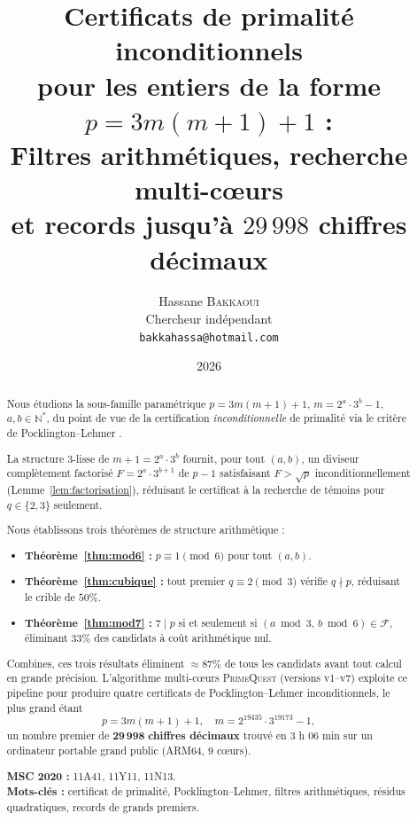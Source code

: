 \documentclass[11pt,a4paper]{article}
\title{Certificats de primalité inconditionnels\\
pour les entiers de la forme $p = 3m(m+1)+1$ :\\[4pt]
{\large Filtres arithmétiques, recherche multi-c\oe{}urs\\
et records jusqu'à $29\,998$ chiffres décimaux}}
\author{Hassane \textsc{Bakkaoui}\\
\small Chercheur indépendant\\
\small \texttt{bakkahassa@hotmail.com}}
\date{2026}
\theoremstyle{definition}
\theoremstyle{remark}
\newcommand{\N}{\mathbb{N}}
\newcommand{\F}{\mathcal{F}}
\begin{document}
\maketitle

\begin{abstract}
Nous étudions la sous-famille paramétrique $p = 3m(m+1)+1$,
$m = 2^a\cdot 3^b - 1$, $a,b \in \N^*$, du point de vue de la
certification \emph{inconditionnelle} de primalité via le critère de
Pocklington--Lehmer \cite{Pocklington1914,LehmerPSW1975}.

La structure $3$-lisse de $m+1 = 2^a\cdot 3^b$ fournit, pour tout $(a,b)$,
un diviseur complètement factorisé $F = 2^a\cdot 3^{b+1}$ de $p-1$
satisfaisant $F>\sqrt{p}$ inconditionnellement
(Lemme~\ref{lem:factorisation}), réduisant le certificat à la recherche
de témoins pour $q\in\{2,3\}$ seulement.

Nous établissons trois théorèmes de structure arithmétique :
\begin{itemize}
\item \textbf{Théorème~\ref{thm:mod6} :}
  $p\equiv 1\pmod{6}$ pour tout $(a,b)$.
\item \textbf{Théorème~\ref{thm:cubique} :}
  tout premier $q\equiv 2\pmod{3}$ vérifie $q\nmid p$,
  réduisant le crible de $50\%$.
\item \textbf{Théorème~\ref{thm:mod7} :}
  $7\mid p$ si et seulement si $(a\bmod 3,\,b\bmod 6)\in\F$,
  éliminant $33\%$ des candidats à coût arithmétique nul.
\end{itemize}

Combines, ces trois résultats éliminent $\approx 87\%$ de tous les
candidats avant tout calcul en grande précision. L'algorithme
multi-c\oe{}urs \textsc{PrimeQuest} (versions v1--v7) exploite ce pipeline
pour produire quatre certificats de Pocklington--Lehmer inconditionnels,
le plus grand étant
\[
  p = 3m(m+1)+1,\quad m = 2^{19435}\cdot 3^{19173}-1,
\]
un nombre premier de $\mathbf{29\,998}$ \textbf{chiffres décimaux} trouvé
en $3$ h $06$ min sur un ordinateur portable grand public
(ARM64, 9 c\oe{}urs).

\smallskip
\noindent\textbf{MSC 2020 :} 11A41, 11Y11, 11N13.\\
\textbf{Mots-clés :} certificat de primalité, Pocklington--Lehmer,
filtres arithmétiques, résidus quadratiques, records de grands premiers.
\end{abstract}

\tableofcontents
\end{document}
